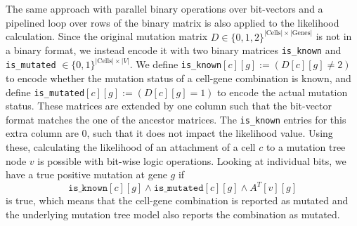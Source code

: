The same approach with parallel binary operations over bit-vectors and a pipelined loop over rows of the binary matrix is also applied to the likelihood calculation. 
Since the original mutation matrix $D \in \{0, 1, 2\}^{|\mathrm{Cells}| \times |\mathrm{Genes}|}$ is not in a binary format, we instead encode it 
with two binary matrices \texttt{is\_known} and \texttt{is\_mutated} $\in \{0, 1\}^{|\mathrm{Cells}| \times |V|}$. We define \texttt{is\_known}$[c][g] := (D[c][g] \neq 2)$ to encode whether the mutation status of a cell-gene combination is known, and define \texttt{is\_mutated}$[c][g] := (D[c][g] = 1)$ to encode the actual mutation status. These matrices are extended by one column such that the bit-vector format matches the one of the ancestor matrices. The \texttt{is\_known} entries for this extra column are $0$, such that it does not impact the likelihood value.
%
Using these, calculating the likelihood of an attachment of a cell $c$ to a mutation tree node $v$ is possible with bit-wise logic operations. 
Looking at individual bits, we have a true positive mutation at gene $g$ if 
\begin{equation}
\texttt{is\_known}[c][g] \wedge \texttt{is\_mutated}[c][g] \wedge A^T[v][g]
\end{equation}
is true, which means that the cell-gene combination is reported as mutated and the underlying mutation tree model also reports the combination as mutated. 
